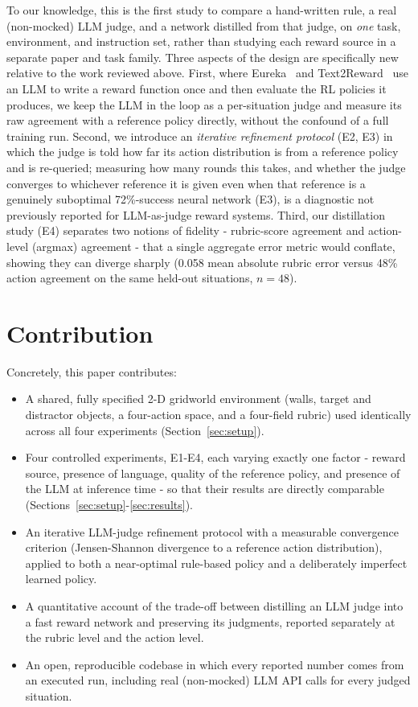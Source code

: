 \documentclass[conference]{IEEEtran}
\begin{document}
To our knowledge, this is the first study to compare a hand-written
rule, a real (non-mocked) LLM judge, and a network distilled from that
judge, on \emph{one} task, environment, and instruction set, rather than
studying each reward source in a separate paper and task family. Three
aspects of the design are specifically new relative to the work reviewed
above. First, where Eureka~\cite{ma2024eureka} and
Text2Reward~\cite{xie2024text2reward} use an LLM to write a reward
function once and then evaluate the RL policies it produces, we keep the
LLM in the loop as a per-situation judge and measure its raw agreement
with a reference policy directly, without the confound of a full
training run. Second, we introduce an \emph{iterative refinement
protocol} (E2, E3) in which the judge is told how far its action
distribution is from a reference policy and is re-queried; measuring how
many rounds this takes, and whether the judge converges to whichever
reference it is given even when that reference is a genuinely suboptimal
72\%-success neural network (E3), is a diagnostic not previously
reported for LLM-as-judge reward systems. Third, our distillation study
(E4) separates two notions of fidelity - rubric-score agreement and
action-level (argmax) agreement - that a single aggregate error metric
would conflate, showing they can diverge sharply (0.058 mean absolute
rubric error versus 48\% action agreement on the same held-out
situations, $n=48$).

\section{Contribution}
\label{sec:contribution}

Concretely, this paper contributes:
\begin{itemize}
  \item A shared, fully specified 2-D gridworld environment (walls,
  target and distractor objects, a four-action space, and a four-field
  rubric) used identically across all four experiments
  (Section~\ref{sec:setup}).
  \item Four controlled experiments, E1-E4, each varying exactly one
  factor - reward source, presence of language, quality of the
  reference policy, and presence of the LLM at inference time - so
  that their results are directly comparable
  (Sections~\ref{sec:setup}-\ref{sec:results}).
  \item An iterative LLM-judge refinement protocol with a measurable
  convergence criterion (Jensen-Shannon divergence to a reference
  action distribution), applied to both a near-optimal rule-based policy
  and a deliberately imperfect learned policy.
  \item A quantitative account of the trade-off between distilling an
  LLM judge into a fast reward network and preserving its judgments,
  reported separately at the rubric level and the action level.
  \item An open, reproducible codebase in which every reported number
  comes from an executed run, including real (non-mocked) LLM API calls
  for every judged situation.
\end{itemize}
\end{document}
